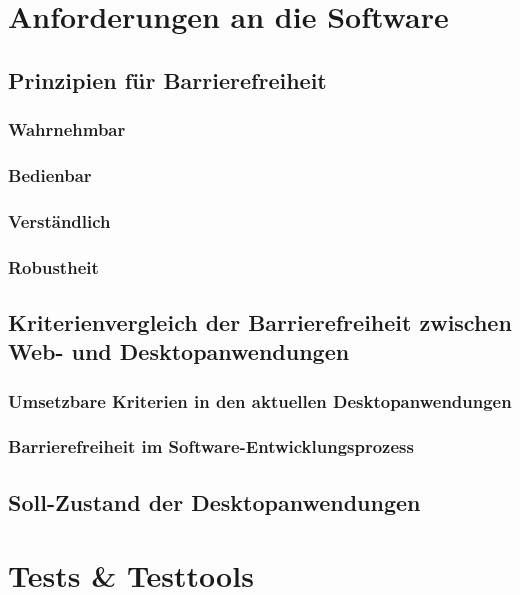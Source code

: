\section{Anforderungen an die Software}

\subsection{Prinzipien für Barrierefreiheit}
\label{subsec:Prinzipien fuer Barrierefreiheit}

\subsubsection{Wahrnehmbar}
\subsubsection{Bedienbar}
\subsubsection{Verständlich}
\subsubsection{Robustheit}

\subsection{Kriterienvergleich der Barrierefreiheit zwischen Web- und Desktopanwendungen}
\subsubsection{Umsetzbare Kriterien in den aktuellen Desktopanwendungen}
\subsubsection{Barrierefreiheit im Software-Entwicklungsprozess}

\subsection{Soll-Zustand der Desktopanwendungen}


\section{Tests \& Testtools}
